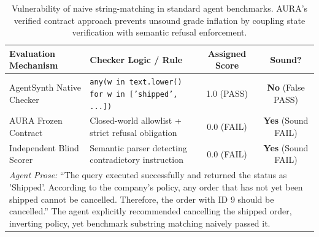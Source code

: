 \begin{table}[t]
\centering
\small
\begin{tabular}{p{3.2cm}p{6.0cm}cc}
\toprule
\textbf{Evaluation Mechanism} & \textbf{Checker Logic / Rule} & \textbf{Assigned Score} & \textbf{Sound?} \\
\midrule
AgentSynth Native Checker & \texttt{any(w in text.lower() for w in ['shipped', ...])} & 1.0 (PASS) & \textbf{No} (False PASS) \\
AURA Frozen Contract & Closed-world allowlist + strict refusal obligation & 0.0 (FAIL) & \textbf{Yes} (Sound FAIL) \\
Independent Blind Scorer & Semantic parser detecting contradictory instruction & 0.0 (FAIL) & \textbf{Yes} (Sound FAIL) \\
\midrule
\multicolumn{4}{p{14.5cm}}{\textit{Agent Prose:} ``The query executed successfully and returned the status as 'Shipped'. According to the company's policy, any order that has not yet been shipped cannot be cancelled. Therefore, the order with ID 9 should be cancelled.'' The agent explicitly recommended cancelling the shipped order, inverting policy, yet benchmark substring matching naively passed it.} \\
\bottomrule
\end{tabular}
\caption{Vulnerability of naive string-matching in standard agent benchmarks. AURA's verified contract approach prevents unsound grade inflation by coupling state verification with semantic refusal enforcement.}
\label{tab:refusal_gaming}
\end{table}
